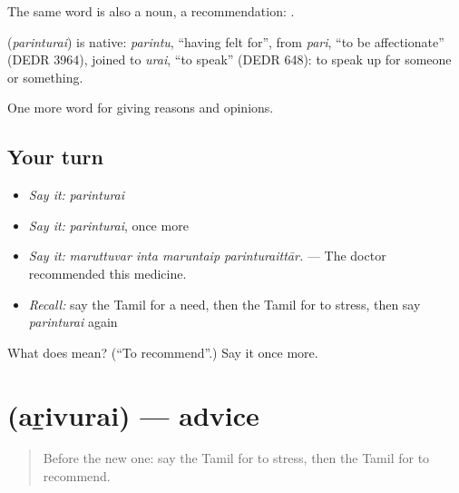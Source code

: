 The same word is also a noun, a recommendation:  .

\begin{cousinweb}
\textbf{} (\emph{parinturai}) is native: \emph{parintu}, \textquotedblleft{}having felt for\textquotedblright{}, from \emph{pari}, \textquotedblleft{}to be affectionate\textquotedblright{} (DEDR 3964), joined to \emph{urai}, \textquotedblleft{}to speak\textquotedblright{} (DEDR 648): to speak up for someone or something.
\end{cousinweb}

\begin{grammarlens}[title={What you've built}]
One more word for giving reasons and opinions.
\end{grammarlens}

\subsection*{Your turn}
\begin{itemize}
\raggedright
  \item \emph{Say it:} \emph{parinturai}
  \item \emph{Say it:} \emph{parinturai}, once more
  \item \emph{Say it:} \emph{maruttuvar inta maruntaip parinturaittār.} — The doctor recommended this medicine.
  \item \emph{Recall:} say the Tamil for a need, then the Tamil for to stress, then say \emph{parinturai} again
\end{itemize}

\begin{tcolorbox}[breakable,colback=teal!4,colframe=teal!35!black,title={Before you move on}]
What does  mean? (\textquotedblleft{}To recommend\textquotedblright{}.) Say it once more.
\end{tcolorbox}
\section[\texorpdfstring{\ta{அறிவுரை} (aṟivurai)}{அறிவுரை (aṟivurai)}]{ (aṟivurai) — advice}

\label{lesson:TA-C355-arivurai}



\begin{quote}
Before the new one: say the Tamil for to stress, then the Tamil for to recommend.
\end{quote}


